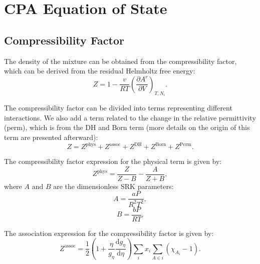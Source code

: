 \newpage
\section{CPA Equation of State}
\subsection{Compressibility Factor}
The density of the mixture can be obtained from the compressibility factor, which can be derived from the residual Helmholtz free energy:
\begin{equation}
     Z = 1 - \frac{v}{RT}\left (  \frac{\partial A^r}{\partial V} \right )_{T,N_i}.
    \label{Eq:Z}
\end{equation}

The compressibility factor can be divided into terms representing different interactions. We also add a term related to the change in the relative permittivity (perm), which is from the DH and Born term (more details on the origin of this term are presented afterward):
\begin{equation}
        Z = Z^\text{phys} + Z^\text{assoc}  + Z^\text{DH} + Z^\text{Born} + Z^\text{Perm}.
        \label{Eq:Z_eCPA}
\end{equation}

The compressibility factor expression for the physical term is given by:
\begin{equation}
        Z^\text{phys} = \frac{Z}{Z-B} - \frac{A}{Z+B},
        \label{Eq:Z_phys}
\end{equation}
where $A$ and $B$ are the dimensionless SRK parameters:
\begin{equation}
    A=\frac{aP}{R^2T^2},
    \label{Eq:CPA_A}
\end{equation}
\begin{equation}
    B=\frac{bP}{RT}.
    \label{Eq:CPA_B}
\end{equation}

The association expression for the compressibility factor is given by:
\begin{equation}
        Z^\text{assoc} =  \frac{1}{2}\left ( 1+\frac{\eta }{g_\eta}\frac{\mathrm{d} g_\eta}{\mathrm{d} \eta} \right )\sum_i x_i \sum_{A \in i}  \left ( \chi_{A_i} -1 \right ).
        \label{Eq:Z_assoc}
\end{equation}

